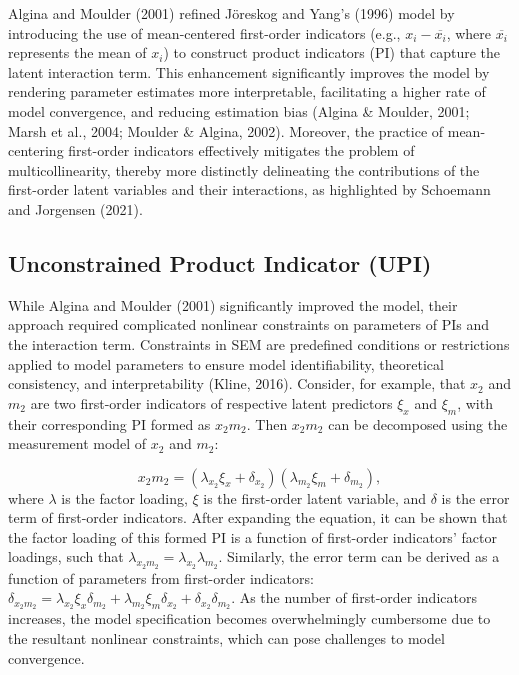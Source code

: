 \documentclass[
  man]{apa6}
\begin{document}
Algina and Moulder (2001) refined Jöreskog and Yang's (1996) model by introducing the use of mean-centered first-order indicators (e.g., \(x_{i} - \overline{x_{i}}\), where \(\overline{x_{i}}\) represents the mean of \(x_{i}\)) to construct product indicators (PI) that capture the latent interaction term. This enhancement significantly improves the model by rendering parameter estimates more interpretable, facilitating a higher rate of model convergence, and reducing estimation bias (Algina \& Moulder, 2001; Marsh et al., 2004; Moulder \& Algina, 2002). Moreover, the practice of mean-centering first-order indicators effectively mitigates the problem of multicollinearity, thereby more distinctly delineating the contributions of the first-order latent variables and their interactions, as highlighted by Schoemann and Jorgensen (2021).

\subsection{Unconstrained Product Indicator (UPI)}\label{unconstrained-product-indicator-upi}

While Algina and Moulder (2001) significantly improved the model, their approach required complicated nonlinear constraints on parameters of PIs and the interaction term. Constraints in SEM are predefined conditions or restrictions applied to model parameters to ensure model identifiability, theoretical consistency, and interpretability (Kline, 2016). Consider, for example, that \(x_{2}\) and \(m_{2}\) are two first-order indicators of respective latent predictors \(\xi_{x}\) and \(\xi_{m}\), with their corresponding PI formed as \(x_{2}m_{2}\). Then \(x_{2}m_{2}\) can be decomposed using the measurement model of \(x_{2}\) and \(m_{2}\):

\begin{equation}
x_{2}m_{2}= (\lambda_{x_{2}}\xi_{x} + \delta_{x_{2}})(\lambda_{m_{2}}\xi_{m} + \delta_{m_{2}}),
\end{equation}
where \(\lambda\) is the factor loading, \(\xi\) is the first-order latent variable, and \(\delta\) is the error term of first-order indicators. After expanding the equation, it can be shown that the factor loading of this formed PI is a function of first-order indicators' factor loadings, such that \(\lambda_{x_{2}m_{2}} = \lambda_{x_{2}}\lambda_{m_{2}}\). Similarly, the error term can be derived as a function of parameters from first-order indicators: \(\delta_{x_{2}m_{2}} = \lambda_{x_{2}}\xi_{x}\delta_{m_{2}} + \lambda_{m_{2}}\xi_{m}\delta_{x_{2}} + \delta_{x_{2}}\delta_{m_{2}}\). As the number of first-order indicators increases, the model specification becomes overwhelmingly cumbersome due to the resultant nonlinear constraints, which can pose challenges to model convergence.
\end{document}
